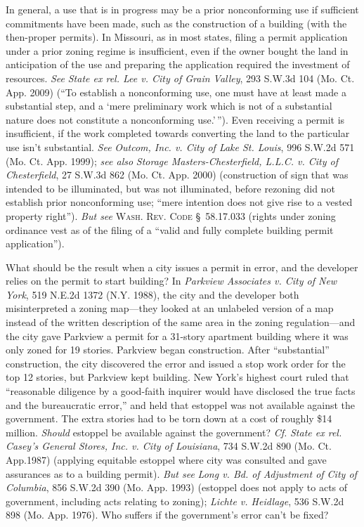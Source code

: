 In general, a use that is in progress may be a prior nonconforming use if
sufficient commitments have been made, such as the construction of a building
(with the then-proper permits). In Missouri, as in most states, filing a permit
application under a prior zoning regime is insufficient, even if the owner
bought the land in anticipation of the use and preparing the application
required the investment of resources. \textit{See} \emph{State ex rel. Lee v.
City of Grain Valley}, 293 S.W.3d 104 (Mo. Ct. App. 2009) (``To establish a
nonconforming use, one must have at least made a substantial step, and a `mere
preliminary work which is not of a substantial nature does not constitute a
nonconforming use.'\,''). Even receiving a permit is insufficient, if the work
completed towards converting the land to the particular use isn't substantial.
\textit{See} \emph{Outcom, Inc. v. City of Lake St. Louis}, 996 S.W.2d 571 (Mo.
Ct. App. 1999); \textit{see also} \emph{Storage Masters-Chesterfield, L.L.C. v.
City of Chesterfield}, 27 S.W.3d 862 (Mo. Ct. App. 2000) (construction of sign
that was intended to be illuminated, but was not illuminated, before rezoning
did not establish prior nonconforming use; ``mere intention does not give rise
to a vested property right''). \textit{But see} \textsc{Wash. Rev. Code}
\S~58.17.033 (rights under zoning ordinance vest as of the filing of a ``valid
and fully complete building permit application'').

What should be the result when a city issues a permit in error, and the
developer relies on the permit to start building? In \textit{Parkview Associates
v. City of New York}, 519 N.E.2d 1372 (N.Y. 1988), the city and the developer
both misinterpreted a zoning map---they looked at an unlabeled version of a map
instead of the written description of the same area in the zoning
regulation---and the city gave Parkview a permit for a 31-story apartment
building where it was only zoned for 19 stories. Parkview began construction.
After ``substantial'' construction, the city discovered the error and issued a
stop work order for the top 12 stories, but Parkview kept building. New York's
highest court ruled that ``reasonable diligence by a good-faith inquirer would
have disclosed the true facts and the bureaucratic error,'' and held that
estoppel was not available against the government. The extra stories had to be
torn down at a cost of roughly \$14 million. \textit{Should} estoppel be
available against the government? \textit{Cf.} \emph{State ex rel. Casey's
General Stores, Inc. v. City of Louisiana}, 734 S.W.2d 890 (Mo. Ct. App.1987)
(applying equitable estoppel where city was consulted and gave assurances as to
a building permit). \textit{But see} \emph{Long v. Bd. of Adjustment of City of
Columbia}, 856 S.W.2d 390 (Mo. App. 1993) (estoppel does not apply to acts of
government, including acts relating to zoning); \emph{Lichte v. Heidlage}, 536
S.W.2d 898 (Mo. App. 1976). Who suffers if the government's error can't be
fixed?

